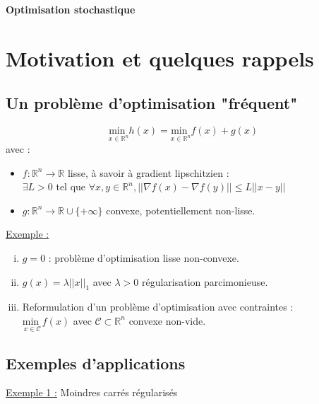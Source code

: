 \documentclass[12pt,a4paper]{article}
\begin{document}
\begin{center}
    \textbf{Optimisation stochastique}\\
\end{center}

\tableofcontents
\listoffigures
\newpage

\section{Motivation et quelques rappels}

\subsection{Un problème d'optimisation "fréquent"}

\begin{equation}
    \underset{x \in \mathbb{R}^n}{\text{min }} h(x) = \underset{x \in \mathbb{R}^n}{\text{min }} f(x) + g(x)
\end{equation}
avec :
\begin{itemize}
    \item $f : \mathbb{R}^n \rightarrow \mathbb{R}$ lisse, à savoir à gradient lipschitzien :\\
    $\exists L > 0$ tel que $\forall x, y \in \mathbb{R}^n, ||\nabla f(x) - \nabla f(y)|| \leq L ||x - y||$
    \item $g : \mathbb{R}^n \rightarrow \mathbb{R} \cup \{+\infty\}$ convexe, potentiellement non-lisse.
\end{itemize}

\underline{Exemple :}
\begin{enumerate}[i)]
    \item $g = 0$ : problème d'optimisation lisse non-convexe.
    \item $g(x) = \lambda ||x||_1$ avec $\lambda > 0$ régularisation parcimonieuse.
    \item Reformulation d'un problème d'optimisation avec contraintes :\\
    $\underset{x \in \mathcal{C}}{\text{min }} f(x)$ avec $\mathcal{C} \subset \mathbb{R}^n$ convexe non-vide.\\
\end{enumerate}


\subsection{Exemples d'applications}

\underline{Exemple 1 :} Moindres carrés régularisés\\
\end{document}
